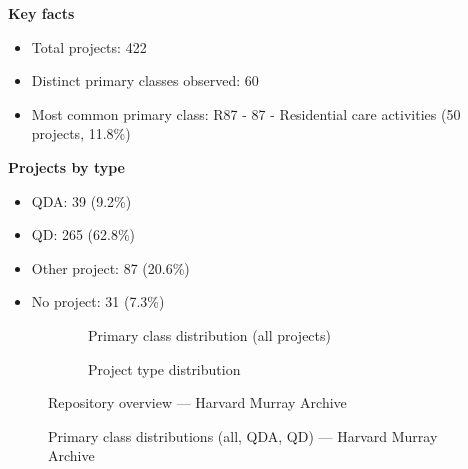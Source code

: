 \textbf{Key facts}

\begin{itemize}
    \item Total projects: 422
    \item Distinct primary classes observed: 60
    \item Most common primary class: R87 - 87 - Residential care activities (50 projects, 11.8\%)
\end{itemize}

\textbf{Projects by type}

\begin{itemize}
    \item QDA: 39 (9.2\%)
    \item QD: 265 (62.8\%)
    \item Other project: 87 (20.6\%)
    \item No project: 31 (7.3\%)
\end{itemize}

\begin{figure}[H]
    \centering
    \begin{subfigure}[t]{0.49\textwidth}
        \centering
        
        \caption{Primary class distribution (all projects)}
    \end{subfigure}
    \hfill
    \begin{subfigure}[t]{0.49\textwidth}
        \centering
        
        \caption{Project type distribution}
    \end{subfigure}
    \caption{Repository overview --- Harvard Murray Archive}
\end{figure}

\clearpage

\begin{figure}[H]
    \centering
    
    \par\vspace{0.8em}
    
    \par\vspace{0.8em}
    
    \caption{Primary class distributions (all, QDA, QD) --- Harvard Murray Archive}
\end{figure}

